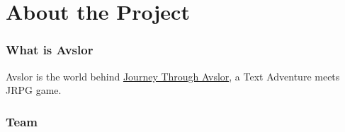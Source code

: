\chapter{About the Project}
\subsection*{What is Avslor}
\begin{paragraph}
Avslor is the world behind \href{http://github.com/Avslor/JourneyThoughAvslor}{Journey Through Avslor}, a Text Adventure meets JRPG game.
\end{paragraph}
\subsection*{Team}

\clearpage